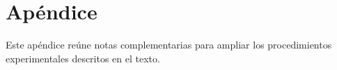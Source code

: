\section{Apéndice}
Este apéndice reúne notas complementarias para ampliar los procedimientos experimentales descritos en el texto.